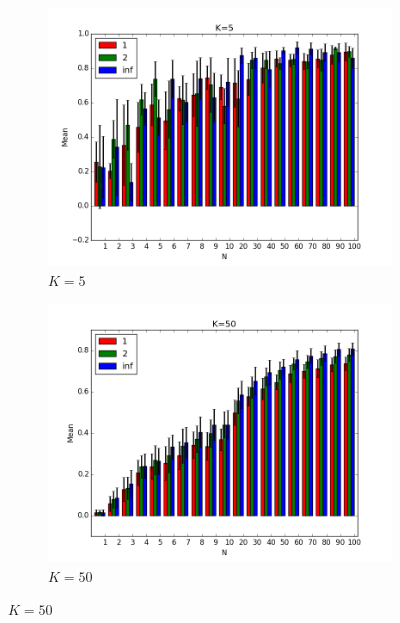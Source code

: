 \documentclass{article}
\begin{document}
\begin{figure}[H]
    \centering
    \begin{subfigure}[h]{0.45\textwidth}
        \includegraphics[width=\textwidth]{l-experiment1-1-5-inf.png}
        \caption{$K=5$}
        \label{fig:exp1k5}
    \end{subfigure}
   \begin{subfigure}[h]{0.45\textwidth}
        \includegraphics[width=\textwidth]{l-experiment1-1-50-inf.png}
        \caption{$K=50$}
        \label{fig:exp11k50}
    \end{subfigure}
\end{figure}
\end{document}
